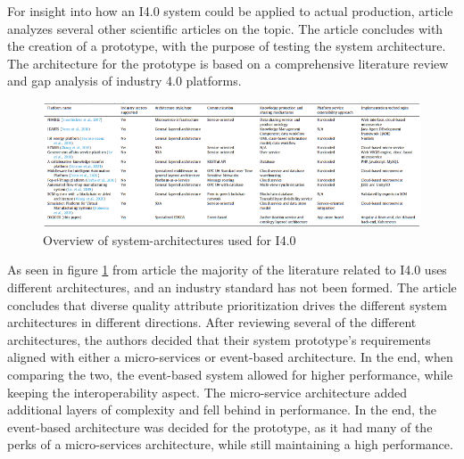 For insight into how an I4.0 system could be applied to actual production, article \cite{Liu2022} analyzes several other scientific articles on the topic. The article concludes with the creation of a prototype, with the purpose of testing the system architecture. The architecture for the prototype is based on a comprehensive literature review and gap analysis of industry 4.0 platforms.

\begin{figure}[!ht]
    \centering
    \includegraphics[scale=0.85]{Images/ArticleReviewRotate.png}
    \caption{Overview of system-architectures used for I4.0}
    \label{figure:1}
\end{figure}


As seen in figure \ref{figure:1} from article \cite{Liu2022} the majority of the literature related to I4.0 uses different architectures, and an industry standard has not been formed. The article concludes that diverse quality attribute prioritization drives the different system architectures in different directions. After reviewing several of the different architectures, the authors decided that their system prototype's requirements aligned with either a micro-services or event-based architecture. In the end, when comparing the two, the event-based system allowed for higher performance, while keeping the interoperability aspect. The micro-service architecture added additional layers of complexity and fell behind in performance. In the end, the event-based architecture was decided for the prototype, as it had many of the perks of a micro-services architecture, while still maintaining a high performance.

